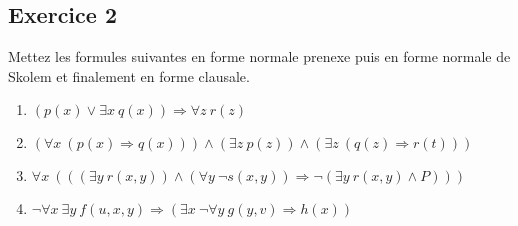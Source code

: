 \subsection*{Exercice 2}
Mettez les formules suivantes en forme normale prenexe puis en forme normale de Skolem et finalement en forme clausale.
\begin{enumerate}
\item $(p(x) \vee \exists x \ q(x)) \Rightarrow \forall z \ r(z)$
\item $(\forall x \ (p(x) \Rightarrow q(x))) \wedge (\exists z \ p(z)) \wedge (\exists z \ (q(z) \Rightarrow r(t)))$
\item $\forall x \ ( ((\exists y \ r(x, y)) \wedge (\forall y \  \neg s(x, y)) \Rightarrow \neg (\exists y \ r(x, y) \wedge P)) )$
\item $\neg \forall x \ \exists y \ f(u, x, y) \Rightarrow (\exists x \ \neg \forall y \ g(y, v) \Rightarrow h(x))$
\end{enumerate}

